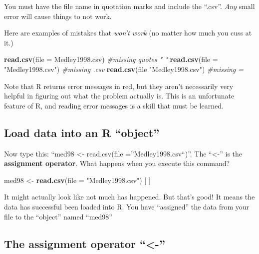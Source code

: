 \documentclass[]{book}
\newenvironment{Shaded}{\begin{snugshade}}{\end{snugshade}}
\newcommand{\KeywordTok}[1]{\textcolor[rgb]{0.13,0.29,0.53}{\textbf{#1}}}
\newcommand{\DataTypeTok}[1]{\textcolor[rgb]{0.13,0.29,0.53}{#1}}
\newcommand{\StringTok}[1]{\textcolor[rgb]{0.31,0.60,0.02}{#1}}
\newcommand{\CommentTok}[1]{\textcolor[rgb]{0.56,0.35,0.01}{\textit{#1}}}
\newcommand{\NormalTok}[1]{#1}
\theoremstyle{definition}
\theoremstyle{definition}
\theoremstyle{definition}
\theoremstyle{remark}
\begin{document}
You must have the file name in quotation marks and include the ``.csv''.
\emph{Any} small error will cause things to not work.

Here are examples of mistakes that \emph{won't work} (no matter how much
you cuss at it.)

\begin{Shaded}
\begin{Highlighting}[]
\KeywordTok{read.csv}\NormalTok{(}\DataTypeTok{file =}\NormalTok{ Medley1998.csv)     }\CommentTok{#missing quotes " "}
\KeywordTok{read.csv}\NormalTok{(}\DataTypeTok{file =} \StringTok{"Medley1998.csv"}\NormalTok{)   }\CommentTok{#missing .csv}
\KeywordTok{read.csv}\NormalTok{(file }\StringTok{"Medley1998.csv"}\NormalTok{)     }\CommentTok{#missing =}
\end{Highlighting}
\end{Shaded}

Note that R returns error messages in red, but they aren't necessarily
very helpful in figuring out what the problem actually is. This is an
unfortunate feature of R, and reading error messages is a skill that
must be learned.

\subsection{\texorpdfstring{Load data into an R
``object''}{Load data into an R object}}\label{load-data-into-an-r-object}

Now type this: ``med98 \textless{}- read.csv(file
=''Medley1998.csv``)''. The ``\textless{}-'' is the \textbf{assignment
operator}. What happens when you execute this command?

\begin{Shaded}
\begin{Highlighting}[]
\NormalTok{med98 <-}\StringTok{ }\KeywordTok{read.csv}\NormalTok{(}\DataTypeTok{file =} \StringTok{"Medley1998.csv"}\NormalTok{) [ ]}
\end{Highlighting}
\end{Shaded}

It might actually look like not much has happened. But that's good! It
means the data has successful been loaded into R. You have ``assigned''
the data from your file to the ``object'' named ``med98''

\subsection{\texorpdfstring{The assignment operator
``\textless{}-''}{The assignment operator \textless{}-}}\label{the-assignment-operator--}
\end{document}
